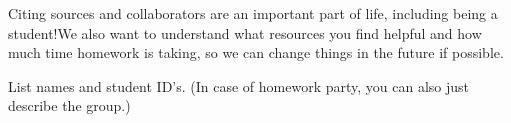 \newline
Citing sources and collaborators are an important part of life, including being a student!We also want to understand what resources you find helpful and how much time homework is taking, so we can change things in the future if possible.

\begin{enumerate}
    
     \newline
    List names and student ID’s. (In case of homework party, you can also just describe the group.)
\end{enumerate}